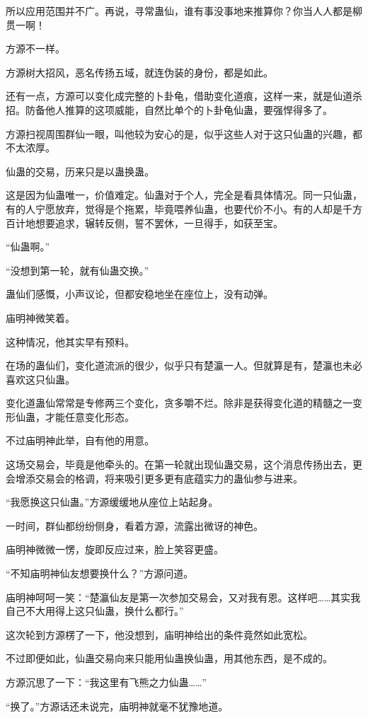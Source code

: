 \begin{this_body}
所以应用范围并不广。再说，寻常蛊仙，谁有事没事地来推算你？你当人人都是柳贯一啊！

方源不一样。

方源树大招风，恶名传扬五域，就连伪装的身份，都是如此。

还有一点，方源可以变化成完整的卜卦龟，借助变化道痕，这样一来，就是仙道杀招。防备他人推算的这项威能，自然比单个的卜卦龟仙蛊，要强悍得多了。

方源扫视周围群仙一眼，叫他较为安心的是，似乎这些人对于这只仙蛊的兴趣，都不太浓厚。

仙蛊的交易，历来只是以蛊换蛊。

这是因为仙蛊唯一，价值难定。仙蛊对于个人，完全是看具体情况。同一只仙蛊，有的人宁愿放弃，觉得是个拖累，毕竟喂养仙蛊，也要代价不小。有的人却是千方百计地想要追求，辗转反侧，誓不罢休，一旦得手，如获至宝。

“仙蛊啊。”

“没想到第一轮，就有仙蛊交换。”

蛊仙们感慨，小声议论，但都安稳地坐在座位上，没有动弹。

庙明神微笑着。

这种情况，他其实早有预料。

在场的蛊仙们，变化道流派的很少，似乎只有楚瀛一人。但就算是有，楚瀛也未必喜欢这只仙蛊。

变化道蛊仙常常是专修两三个变化，贪多嚼不烂。除非是获得变化道的精髓之一变形仙蛊，才能任意变化形态。

不过庙明神此举，自有他的用意。

这场交易会，毕竟是他牵头的。在第一轮就出现仙蛊交易，这个消息传扬出去，更会增添交易会的格调，将来吸引更多更有底蕴实力的蛊仙参与进来。

“我愿换这只仙蛊。”方源缓缓地从座位上站起身。

一时间，群仙都纷纷侧身，看着方源，流露出微讶的神色。

庙明神微微一愣，旋即反应过来，脸上笑容更盛。

“不知庙明神仙友想要换什么？”方源问道。

庙明神呵呵一笑：“楚瀛仙友是第一次参加交易会，又对我有恩。这样吧……其实我自己不大用得上这只仙蛊，换什么都行。”

这次轮到方源楞了一下，他没想到，庙明神给出的条件竟然如此宽松。

不过即便如此，仙蛊交易向来只能用仙蛊换仙蛊，用其他东西，是不成的。

方源沉思了一下：“我这里有飞熊之力仙蛊……”

“换了。”方源话还未说完，庙明神就毫不犹豫地道。


\end{this_body}
